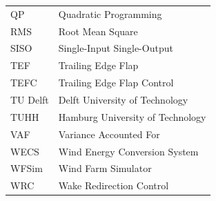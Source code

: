 \begin{longtable}{ll}
    {QP}  & {Quadratic Programming}\\
    {RMS} & {Root Mean Square}\\
    {SISO} & {Single-Input Single-Output} \\
    {TEF} & {Trailing Edge Flap} \\
    {TEFC} & {Trailing Edge Flap Control}\\
    {TU Delft} & {Delft University of Technology} \\
    {TUHH} & {Hamburg University of Technology} \\
    {VAF} & {Variance Accounted For}\\
    {WECS} & {Wind Energy Conversion System} \\
    {WFSim} & {Wind Farm Simulator} \\
    {WRC} & {Wake Redirection Control} \\
\end{longtable}